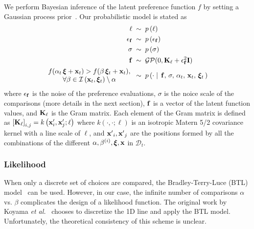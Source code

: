 We perform Bayesian inference of the latent preference function \(f\) by setting a Gaussian process prior~\cite{rasmussen_gaussian_2006}.
Our probabilistic model is stated as 
%
{
\begin{align*}
\ell          \;&\sim \; p\,(\ell) \\
\epsilon_{\mathbf{f}} \;&\sim \; p\,(\epsilon_{\mathbf{f}}) \\
\sigma        \;&\sim \; p\,(\sigma) \\
\mathbf{f}           \;&\sim \; \mathcal{GP}(0, \mathbf{K}_{\ell} + \epsilon_{\mathbf{f}}^2\mathbf{I}) \\
\begin{matrix}
\; f(\alpha_t\,\bm{\xi} + \mathbf{x}_t) > f(\beta\,\bm{\xi}_t + \mathbf{x}_t), \; \\
\; \forall\beta \in \mathcal{I}\left(\mathbf{x}_t, \bm{\xi}_t\right) \setminus \alpha \;
\end{matrix}\; &\sim \; p\left(\cdot \mid\, \mathbf{f},\, \sigma,\, \alpha_t,\, \mathbf{x}_t,\, \bm{\xi}_t\,\right) 
\end{align*}
}
{\noindent}where \(\epsilon_{\mathbf{f}}\) is the noise of the preference evaluations, \(\sigma\) is the noice scale of the comparisons (more details in the next section), \(\mathbf{f}\) is a vector of the latent function values, and \(\mathcal{\mathbf{K}}_{\ell}\) is the Gram matrix.
Each element of the Gram matrix is defined as
\(
  {[\mathbf{K}_{\ell}]}_{i,j} = k\left(\mathbf{x}^\prime_i, \mathbf{x}^\prime_j; \ell \right)
\)
where \(k\left(\cdot, \cdot; \ell \right)\) is an isotropic Matern 5/2 covariance kernel with a line scale of \(\ell\), and \({\mathbf{x}^\prime}_i, {\mathbf{x}^\prime}_j\) are the positions formed by all the combinations of the different \(\alpha, \beta^{(i)}, \bm{\xi}, \mathbf{x}\) in \(\mathcal{D}_t\).

\subsubsection{Likelihood}
When only a discrete set of choices are compared, the Bradley-Terry-Luce (BTL) model~\cite{10.1145/3072959.3073598} can be used.
However, in our case, the infinite number of comparisons \(\alpha\) vs. \(\beta\) complicates the design of a likelihood function.
The original work by Koyama \textit{et al.}~\cite{koyama_sequential_2020} chooses to discretize the 1D line and apply the BTL model.
Unfortunately, the theoretical consistency of this scheme is unclear.

